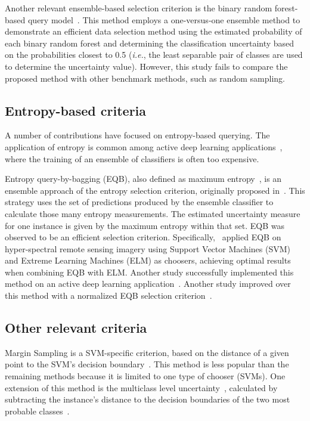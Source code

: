\documentclass[remotesensing,article,submit,moreauthors,pdftex]{Definitions/mdpi}
\begin{document}
Another relevant ensemble-based selection criterion is the binary random
forest-based query model~\cite{Su2020}. This method employs a one-versus-one
ensemble method to demonstrate an efficient data selection method using the
estimated probability of each binary random forest and determining the
classification uncertainty based on the probabilities closest to 0.5
(\textit{i.e.}, the least separable pair of classes are used to determine the
uncertainty value). However, this study fails to compare the proposed method
with other benchmark methods, such as random sampling.

\subsection{Entropy-based criteria}

A number of contributions have focused on entropy-based querying. The
application of entropy is common among active deep learning
applications~\cite{Aghdam2019}, where the training of an ensemble of
classifiers is often too expensive. 

Entropy query-by-bagging (EQB), also defined as maximum
entropy~\cite{Liu2020}, is an ensemble approach of the entropy selection
criterion, originally proposed in~\cite{Tuia2009}. This strategy uses the set
of predictions produced by the ensemble classifier to calculate those many
entropy measurements. The estimated uncertainty measure for one instance is
given by the maximum entropy within that set. EQB was observed to be an
efficient selection criterion. Specifically,~\cite{Shrivastava2021} applied
EQB on hyper-spectral remote sensing imagery using Support Vector Machines
(SVM) and Extreme Learning Machines (ELM) as choosers, achieving optimal
results when combining EQB with ELM\@. Another study successfully implemented
this method on an active deep learning application~\cite{Liu2020}. Another
study improved over this method with a normalized EQB selection
criterion~\cite{Copa2010}.

\subsection{Other relevant criteria}

Margin Sampling is a SVM-specific criterion, based on the distance of a given
point to the SVM's decision boundary~\cite{Shrivastava2021}. This method is
less popular than the remaining methods because it is limited to one type of
chooser (SVMs). One extension of this method is the multiclass level
uncertainty~\cite{Shrivastava2021}, calculated by subtracting the instance's
distance to the decision boundaries of the two most probable
classes~\cite{Demir2011}.
\end{document}
